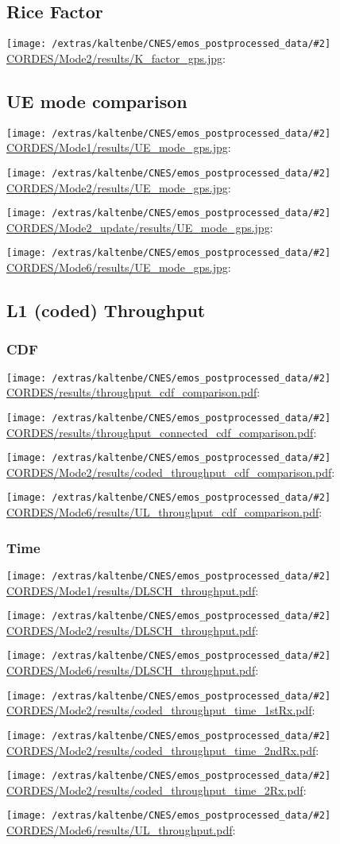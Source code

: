 \documentclass[a4paper,10pt]{article}
\newcommand{\printfile}[2][]{
 \begin{minipage}{8cm}
  \centering
  \texttt{[image: /extras/kaltenbe/CNES/emos\_postprocessed\_data/\#2]}
  \url{#2}: #1

 \end{minipage}
}
\begin{document}
\subsection{Rice Factor}

\printfile{CORDES/Mode2/results/K_factor_gps.jpg}

\subsection{UE mode comparison}

\printfile{CORDES/Mode1/results/UE_mode_gps.jpg}
\printfile{CORDES/Mode2/results/UE_mode_gps.jpg}

\printfile{CORDES/Mode2_update/results/UE_mode_gps.jpg}
\printfile{CORDES/Mode6/results/UE_mode_gps.jpg}

\subsection{L1 (coded) Throughput}


\subsubsection{CDF}


\printfile{CORDES/results/throughput_cdf_comparison.pdf}
\printfile{CORDES/results/throughput_connected_cdf_comparison.pdf}


\printfile{CORDES/Mode2/results/coded_throughput_cdf_comparison.pdf}
\printfile{CORDES/Mode6/results/UL_throughput_cdf_comparison.pdf}

\subsubsection{Time}

\printfile{CORDES/Mode1/results/DLSCH_throughput.pdf}
\printfile{CORDES/Mode2/results/DLSCH_throughput.pdf}

\printfile{CORDES/Mode6/results/DLSCH_throughput.pdf}
\printfile{CORDES/Mode2/results/coded_throughput_time_1stRx.pdf}

\printfile{CORDES/Mode2/results/coded_throughput_time_2ndRx.pdf}
\printfile{CORDES/Mode2/results/coded_throughput_time_2Rx.pdf}

\printfile{CORDES/Mode6/results/UL_throughput.pdf}
\end{document}
